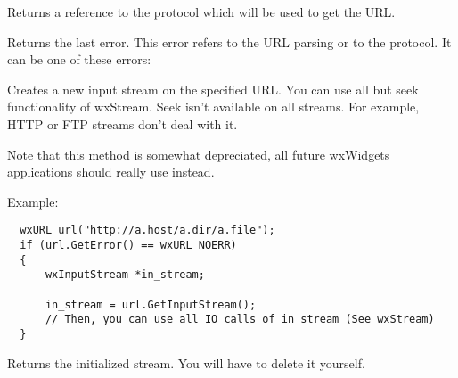 
Returns a reference to the protocol which will be used to get the URL.

%
%
\label{wxurlgeterror}


Returns the last error. This error refers to the URL parsing or to the protocol.
It can be one of these errors:

\twocolwidtha{7cm}
\begin{twocollist}\itemsep=0pt%
\end{twocollist}%

%
%
\label{wxurlgetinputstream}


Creates a new input stream on the specified URL. You can use all but seek
functionality of wxStream. Seek isn't available on all streams. For example,
HTTP or FTP streams don't deal with it.

Note that this method is somewhat depreciated, all future wxWidgets applications
should really use  instead.

Example:

\begin{verbatim}
  wxURL url("http://a.host/a.dir/a.file");
  if (url.GetError() == wxURL_NOERR)
  {
      wxInputStream *in_stream;

      in_stream = url.GetInputStream();
      // Then, you can use all IO calls of in_stream (See wxStream)
  }
\end{verbatim}


Returns the initialized stream. You will have to delete it yourself.




